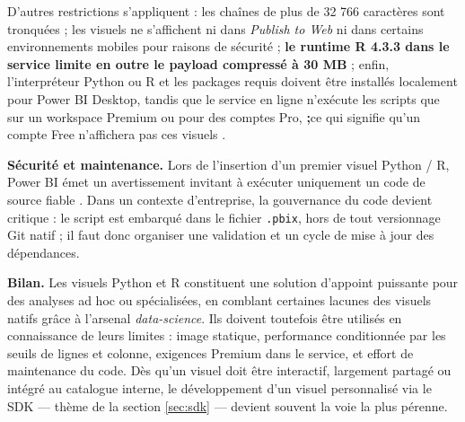 D’autres restrictions s’appliquent : les chaînes de plus de 32 766 caractères
sont tronquées ; les visuels ne s’affichent ni dans \textit{Publish to Web}
ni dans certains environnements mobiles pour raisons de sécurité ;
\textbf{le runtime R 4.3.3 dans le service limite en outre le payload
compressé à 30 MB}\parencite{MicrosoftRPackagesService2025} ; enfin,
l’interpréteur Python ou R et les packages requis doivent être installés
localement pour Power BI Desktop, tandis que le service en ligne n’exécute
les scripts que sur un workspace Premium ou pour des comptes Pro,  
\textbf;{ce qui signifie qu’un compte Free n’affichera pas ces visuels}
\parencite{MicrosoftPythonRVisualsDocs2024}. %


\textbf{Sécurité et maintenance.}  
Lors de l’insertion d’un premier visuel Python / R, Power BI émet un
avertissement invitant à exécuter uniquement un code de source fiable
\parencite{MicrosoftPythonRVisualsDocs2024}.  
Dans un contexte d’entreprise, la gouvernance du code devient critique :
le script est embarqué dans le fichier \texttt{.pbix}, hors de tout
versionnage Git natif ; il faut donc organiser une validation et un cycle de
mise à jour des dépendances.


\textbf{Bilan.}  
Les visuels Python et R constituent une solution d’appoint puissante pour
des analyses ad hoc ou spécialisées, en comblant certaines lacunes des
visuels natifs grâce à l’arsenal \textit{data-science}.  
Ils doivent toutefois être utilisés en connaissance de leurs limites :
image statique, performance conditionnée par les seuils de lignes et
colonne, exigences Premium dans le service, et effort de maintenance du
code.  
Dès qu’un visuel doit être interactif, largement partagé ou intégré au
catalogue interne, le développement d’un visuel personnalisé via le SDK —
thème de la section \ref{sec:sdk} — devient souvent la voie la plus pérenne.
